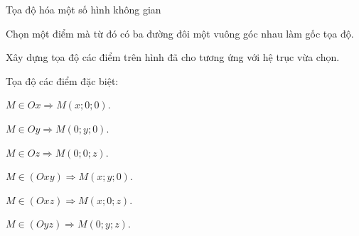 \begin{dang}{Tọa độ hóa một số hình không gian}
	\begin{listEX}[1]
		\item [\ding{172}] Chọn một điểm mà từ đó có ba đường đôi một vuông góc nhau làm gốc tọa độ.
		\item [\ding{173}] Xây dựng tọa độ các điểm trên hình đã cho tương ứng với hệ trục vừa chọn.
		\item [\ding{173}] Tọa độ các điểm đặc biệt:
		\begin{listEX}[2]
			\item [$\bullet$] $M \in Ox \Rightarrow M(x;0;0)$.
			\item [$\bullet$] $M \in Oy \Rightarrow M(0;y;0)$.
			\item [$\bullet$] $M \in Oz \Rightarrow M(0;0;z)$.
			\item [$\bullet$] $M \in (Oxy) \Rightarrow M(x;y;0)$.
			\item [$\bullet$] $M \in (Oxz) \Rightarrow M(x;0;z)$.
			\item [$\bullet$] $M \in (Oyz) \Rightarrow M(0;y;z)$.
		\end{listEX}
	\end{listEX}
\end{dang}
\setcounter{vd}{0}

